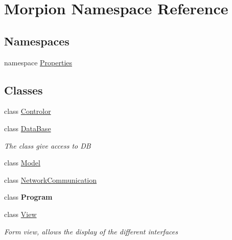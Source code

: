 \hypertarget{namespace_morpion}{}\section{Morpion Namespace Reference}
\label{namespace_morpion}
\subsection*{Namespaces}
\begin{DoxyCompactItemize}
\item 
namespace \hyperlink{namespace_morpion_1_1_properties}{Properties}
\end{DoxyCompactItemize}
\subsection*{Classes}
\begin{DoxyCompactItemize}
\item 
class \hyperlink{class_morpion_1_1_controlor}{Controlor}
\item 
class \hyperlink{class_morpion_1_1_data_base}{Data\+Base}
\begin{DoxyCompactList}\small\item\em The class give access to DB \end{DoxyCompactList}\item 
class \hyperlink{class_morpion_1_1_model}{Model}
\item 
class \hyperlink{class_morpion_1_1_network_communication}{Network\+Communication}
\item 
class {\bfseries Program}
\item 
class \hyperlink{class_morpion_1_1_view}{View}
\begin{DoxyCompactList}\small\item\em Form view, allows the display of the different interfaces \end{DoxyCompactList}\end{DoxyCompactItemize}
